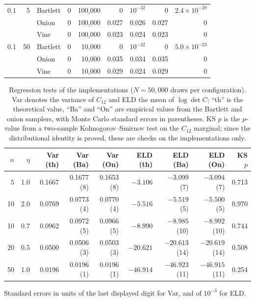 \documentclass[12pt,english]{article}
\theoremstyle{plain} %
\theoremstyle{definition} %
\theoremstyle{remark} %
\begin{document}
\begin{table}[t]
\begin{tabular}{rr l rrrrrr}
$0.1$     &  5 & Bartlett & 0     & 100{,}000 & 0     & $10^{-32}$ & 0     & $2.4\times10^{-28}$ \\
          &    & Onion    & 0     & 100{,}000 & 0.027 & 0.026      & 0.027 & 0 \\
          &    & Vine     & 0     & 100{,}000 & 0.023 & 0.024      & 0.023 & 0 \\
$0.1$     & 50 & Bartlett & 0     & 10{,}000  & 0     & $10^{-32}$ & 0     & $5.0\times10^{-23}$ \\
          &    & Onion    & 0     & 10{,}000  & 0.035 & 0.034      & 0.035 & 0 \\
          &    & Vine     & 0     & 10{,}000  & 0.029 & 0.024      & 0.029 & 0 \\
\bottomrule
\end{tabular}
\end{table}

\begin{table}[t]
\centering
\caption{Regression tests of the implementations ($N=50{,}000$ draws per configuration).
Var denotes the variance of $C_{12}$ and ELD the mean of $\log\det C$;
``th'' is the theoretical value, ``Ba'' and ``On'' are empirical values from the Bartlett and onion samplers, with Monte Carlo standard errors in parentheses.
KS $p$ is the $p$-value from a two-sample Kolmogorov--Smirnov test on the $C_{12}$ marginal; since the distributional identity is proved, these are checks on the implementations only.}
\label{tab:validation}
\small
\begin{tabular}{rr rrr rrr r}
\toprule
$n$ & $\eta$
  & Var (th) & Var (Ba) & Var (On)
  & ELD (th) & ELD (Ba) & ELD (On)
  & KS $p$ \\
\midrule
  5 & 1.0 & 0.1667 & 0.1677 (8)  & 0.1653 (8)  & $-3.106$ & $-3.099$ (7)  & $-3.094$ (7)  & 0.713 \\
 10 & 2.0 & 0.0769 & 0.0773 (4)  & 0.0770 (4)  & $-5.516$ & $-5.519$ (5)  & $-5.500$ (5)  & 0.970 \\
 10 & 0.7 & 0.0962 & 0.0972 (5)  & 0.0966 (5)  & $-8.990$ & $-8.985$ (10) & $-8.992$ (10) & 0.744 \\
 20 & 0.5 & 0.0500 & 0.0506 (3)  & 0.0503 (3)  & $-20.621$ & $-20.613$ (14) & $-20.619$ (14) & 0.508 \\
 50 & 1.0 & 0.0196 & 0.0196 (1)  & 0.0196 (1)  & $-46.914$ & $-46.923$ (11) & $-46.915$ (11) & 0.254 \\
\bottomrule
\end{tabular}
\par\smallskip
{\footnotesize Standard errors in units of the last displayed digit for Var, and of $10^{-3}$ for ELD.}
\end{table}
\end{document}
